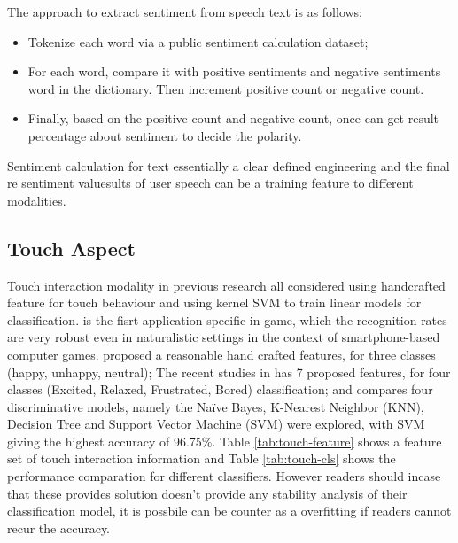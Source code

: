 The approach to extract sentiment from speech text is
as follows:
\begin{itemize}
  \item Tokenize each word via a public sentiment calculation dataset;
  \item For each word, compare it with positive
  sentiments and negative sentiments word
  in the dictionary. Then increment positive
  count or negative count.
  \item Finally, based on the positive count and
  negative count, once can get result percentage about sentiment to decide the
  polarity.
\end{itemize}

Sentiment calculation for text essentially a clear defined engineering and the final re sentiment valuesults of user speech can be a training feature to different modalities.

\subsection{Touch Aspect}\label{subsec:touch-model}

Touch interaction modality in previous research all considered using handcrafted feature for touch behaviour and using kernel SVM to train linear models for classification. \cite{Gao2012} is the fisrt application specific in game, which the recognition rates are very robust even in naturalistic settings in the context of smartphone-based computer games. 
\cite{Shah2015} proposed a reasonable hand crafted features, for three classes (happy, unhappy, neutral); The recent studies in \cite{bhattacharya2017predictive} has 7 proposed features, for four classes (Excited, Relaxed, Frustrated, Bored) classification; and \cite{Tikadar2017} compares four discriminative models, namely the Naïve Bayes, K-Nearest Neighbor (KNN), Decision Tree and Support Vector Machine (SVM) were explored, with SVM giving the highest accuracy of 96.75\%. Table \ref{tab:touch-feature} shows a feature set of touch interaction information and Table \ref{tab:touch-cls} shows the performance comparation for different classifiers. However readers should incase that these provides solution doesn't provide any stability analysis of their classification model, it is possbile can be counter as a overfitting if readers cannot recur the accuracy.

